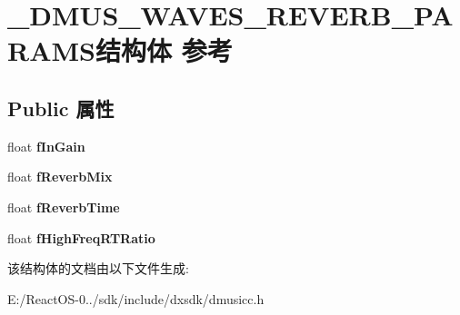 \hypertarget{struct___d_m_u_s___w_a_v_e_s___r_e_v_e_r_b___p_a_r_a_m_s}{}\section{\+\_\+\+D\+M\+U\+S\+\_\+\+W\+A\+V\+E\+S\+\_\+\+R\+E\+V\+E\+R\+B\+\_\+\+P\+A\+R\+A\+M\+S结构体 参考}
\label{struct___d_m_u_s___w_a_v_e_s___r_e_v_e_r_b___p_a_r_a_m_s}
\subsection*{Public 属性}
\begin{DoxyCompactItemize}
\item 
\mbox{\label{struct___d_m_u_s___w_a_v_e_s___r_e_v_e_r_b___p_a_r_a_m_s_ad82820dedd348eda368c96741f2e6891}} 
float {\bfseries f\+In\+Gain}
\item 
\mbox{\label{struct___d_m_u_s___w_a_v_e_s___r_e_v_e_r_b___p_a_r_a_m_s_a826ab48de0c47342a095fffc29f74d90}} 
float {\bfseries f\+Reverb\+Mix}
\item 
\mbox{\label{struct___d_m_u_s___w_a_v_e_s___r_e_v_e_r_b___p_a_r_a_m_s_a65fabf439d75cb45e9cf9a42156a72fc}} 
float {\bfseries f\+Reverb\+Time}
\item 
\mbox{\label{struct___d_m_u_s___w_a_v_e_s___r_e_v_e_r_b___p_a_r_a_m_s_a72cec35370b2f007a677e4343ab37ba1}} 
float {\bfseries f\+High\+Freq\+R\+T\+Ratio}
\end{DoxyCompactItemize}


该结构体的文档由以下文件生成\+:\begin{DoxyCompactItemize}
\item 
E\+:/\+React\+O\+S-\/0../sdk/include/dxsdk/dmusicc.\+h\end{DoxyCompactItemize}
